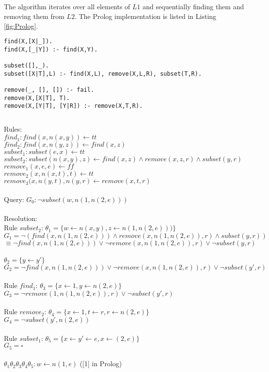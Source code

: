 \documentclass[]{article}
\begin{document}
\subsection{}
The algorithm iterates over all elements of $L1$ and sequentially finding them and removing them from $L2$. The Prolog implementation is listed in Listing \ref{fig:Prolog}.
\begin{lstlisting}[frame=single,caption={The code for $subset(L1,L2)$ in Prolog}]
find(X,[X|_]).
find(X,[_|Y]) :- find(X,Y).

subset([],_).
subset([X|T],L) :- find(X,L), remove(X,L,R), subset(T,R).

remove(_, [], []) :- fail.
remove(X,[X|T], T).
remove(X,[Y|T], [Y|R]) :- remove(X,T,R).
\end{lstlisting}
\label{fig:Prolog}
\subsection{}
Rules:\\
$find_1: find(x,n(x,y)) \leftarrow tt$\\
$find_2: find(x,n(y,z)) \leftarrow find(x,z)$\\
$subset_1: subset(e,x) \leftarrow tt$\\
$subset_2: subset(n(x,y), z) \leftarrow find(x,z)  \wedge remove(x,z,r) \wedge subset(y,r)$\\
$remove_1(x,e, e) \leftarrow ff$\\
$remove_2(x,n(x,t),t) \leftarrow tt$\\
$remove_3(x,n(y,t),n(y,r) \leftarrow remove(x,t,r)$\\ \\
Query: $G_0:\neg subset(w,n(1,n(2,e)))$\\ \\
Resolution:\\
Rule $subset_2$: $\theta_1= \{w\leftarrow n(x,y), z\leftarrow n(1,n(2,e)))\}$\\
$G_1=\neg(find(x,n(1,n(2,e))) \wedge remove(x,n(1,n(2,e)),r)\wedge subset(y,r))$\\
$\equiv \neg find(x,n(1,n(2,e))) \vee\neg remove(x,n(1,n(2,e)),r)\vee\neg subset(y,r)$\\ \\
$\theta_2= \{y\leftarrow y'\}$\\
$G_2 = \neg find(x,n(1,n(2,e))) \vee\neg remove(x,n(1,n(2,e)),r)\vee\neg subset(y',r)$\\ \\
Rule $find_1$: $\theta_3=\{x\leftarrow 1, y\leftarrow n(2,e)\}$\\
$G_3 = \neg remove(1,n(1,n(2,e)),r)\vee\neg subset(y',r)$\\ \\
Rule $remove_2$: $\theta_4=\{x\leftarrow 1, t\leftarrow r, r\leftarrow n(2,e)\}$\\
$G_4 = \neg subset(y',n(2,e))$\\ \\
Rule $subset_1$: $\theta_5 = \{x\leftarrow y'\leftarrow e, x\leftarrow(2,e)\}$\\
$G_5 = \square$\\ \\
$\theta_1\theta_2\theta_3\theta_4\theta_5: w \leftarrow n(1,e)$ ([1] in Prolog)
\end{document}

